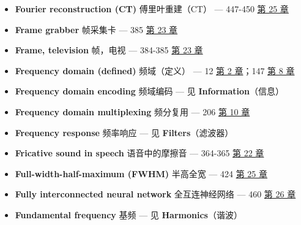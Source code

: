 \begin{itemize}
  \begin{itemize}
  \tightlist
  \item
    chirp signals and systems：啁啾信号与啁啾系统 --- 222-224 
    \hyperref[ch-11]{第 11 章}
  \item
    delta function：冲激函数 --- 210-211  \hyperref[ch-11]{第
    11 章}
  \item
    distorted sinusoid：失真的正弦波 --- 220-221 
    \hyperref[ch-11]{第 11 章}
  \item
    Gaussian：高斯 --- 216-217  \hyperref[ch-11]{第 11 章}
  \item
    Gaussian burst：高斯脉冲串 --- 216-217 
    \hyperref[ch-11]{第 11 章}
  \item
    rectangular pulse：矩形脉冲 --- 212-213 
    \hyperref[ch-11]{第 11 章}
  \item
    shifted impulse：平移的冲激 --- 210-211 
    \hyperref[ch-11]{第 11 章}
  \item
    sinc：sinc --- 215-217  \hyperref[ch-11]{第 11 章}
  \item
    triangular pulse：三角形脉冲 --- 216-217 
    \hyperref[ch-11]{第 11 章}
  \end{itemize}
\item
  \textbf{Fourier reconstruction (CT)} 傅里叶重建（CT） --- 447-450
   \hyperref[ch-25]{第 25 章}
\item
  \textbf{Frame grabber} 帧采集卡 --- 385  \hyperref[ch-23]{第
  23 章}
\item
  \textbf{Frame, television} 帧，电视 --- 384-385 
  \hyperref[ch-23]{第 23 章}
\item
  \textbf{Frequency domain (defined)} 频域（定义） --- 12 
  \hyperref[ch-02]{第 2 章}；147  \hyperref[ch-08]{第 8 章}
\item
  \textbf{Frequency domain encoding} 频域编码 --- 见
  \textbf{Information}（信息）
\item
  \textbf{Frequency domain multiplexing} 频分复用 --- 206 
  \hyperref[ch-10]{第 10 章}
\item
  \textbf{Frequency response} 频率响应 --- 见 \textbf{Filters}（滤波器）
\item
  \textbf{Fricative sound in speech} 语音中的摩擦音 --- 364-365
   \hyperref[ch-22]{第 22 章}
\item
  \textbf{Full-width-half-maximum (FWHM)} 半高全宽 --- 424 
  \hyperref[ch-25]{第 25 章}
\item
  \textbf{Fully interconnected neural network} 全互连神经网络 --- 460
   \hyperref[ch-26]{第 26 章}
\item
  \textbf{Fundamental frequency} 基频 --- 见 \textbf{Harmonics}（谐波）
\end{itemize}

